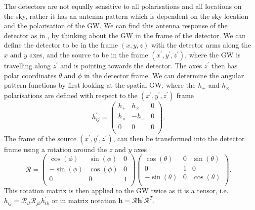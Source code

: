 The detectors are not equally sensitive to all polarisations and all locations on the sky, rather it has an antenna pattern which is dependent on the sky location and the polarisation of the \gls{GW}. 
We can find this antenna response of the detector as in \citep{maggioreGravitationalWaves}, by thinking about the \gls{GW} in the frame of the detector.
We can define the detector to be in the frame $(x,y,z)$ with the detector arms along the $x$ and $y$ axes, and the source to be in the frame $(x^{\prime},y^{\prime},z^{\prime})$, where the \gls{GW} is travelling along $z^{'}$ and is pointing towards the detector. 
The axes $z^{\prime}$ then has polar coordinates $\theta$ and $\phi$ in the detector frame.
We can determine the angular pattern functions by first looking at the spatial \gls{GW}, where the $h_{+}$ and $h_{\times}$ polarisations are defined with respect to the $(x^{\prime},y^{\prime},z^{\prime})$ frame
\begin{equation}
    \label{intro:detector:response:gwwave}
    h^{\prime}_{ij} = \left( 
    \begin{matrix} 
    h_{+} & h_{\times} & 0 \\
    h_{\times} & -h_{+} & 0 \\
    0 & 0 & 0  \\
    \end{matrix}
    \right).
\end{equation}
The frame of the source $(x^{\prime},y^{\prime},z^{\prime})$, can then be transformed into the detector frame using a rotation around the $z$ and $y$ axes 
\begin{equation}
    \label{intro:detector:response:rotation}
    \mathcal{R} = \left( 
    \begin{matrix} 
    \cos(\phi) & \sin(\phi) & 0 \\
    -\sin(\phi) & \cos(\phi) & 0 \\
    0 & 0 & 1  \\
    \end{matrix}
    \right)
    \left( 
    \begin{matrix} 
    \cos(\theta) & 0 & \sin(\theta) \\
    0 & 1 & 0 \\
    -\sin(\theta) & 0 & \cos(\theta)  \\
    \end{matrix}
    \right).
\end{equation}
This rotation matrix is then applied to the \gls{GW} twice as it is a tensor, i.e. $h_{ij} = \mathcal{R}_{il} \mathcal{R}_{jk} h^{\prime}_{lk} $ or in matrix notation $\bm{h} = \bm{\mathcal{R}} \bm{h}^{\prime} \bm{\mathcal{R}}^{T}$.


